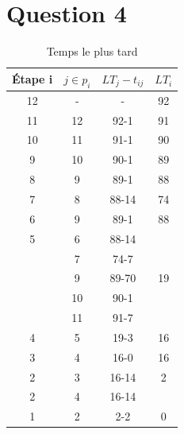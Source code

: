 \documentclass{article}
\begin{document}
\section*{Question 4}
\begin{table}[H]
\caption{Temps le plus tard} \label{tab:Temps le plus tard}
    \begin{center}
        \begin{tabular}{|c|c|c|c|}
            \hline
            Étape i & $j \in p_i$ & $LT_j-t_{ij}$ & $LT_i$ \\
            \hline
            12       & -           & -             & 92     \\
            11       & 12          & 92-1          & 91     \\
            10       & 11          & 91-1          & 90     \\
            9        & 10          & 90-1          & 89     \\
            8        & 9           & 89-1          & 88     \\
            7        & 8           & 88-14         & 74     \\
            6        & 9           & 89-1          & 88     \\
            5        & 6           & 88-14         &        \\
                     & 7           & 74-7          &        \\
                     & 9           & 89-70         & 19     \\
                     & 10          & 90-1          &        \\
                     & 11          & 91-7          &        \\
            
            4        & 5           & 19-3          & 16     \\
            3        & 4           & 16-0          & 16     \\
            2        & 3           & 16-14         & 2      \\
            2        & 4           & 16-14         &        \\
            1        & 2           & 2-2           & 0      \\
            \hline
                                                     
                        
                                        
        \end{tabular}
        \end{center}
\end{table}
\end{document}
